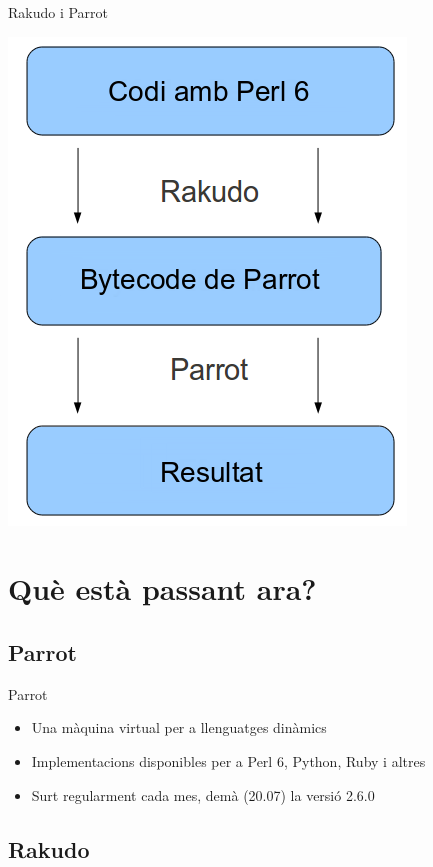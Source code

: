 \documentclass{beamer}
\begin{document}
\begin{frame}{Rakudo i Parrot}
	\begin{center}
		\includegraphics[scale=0.4]{bohomaz_ca}
	\end{center}
\end{frame}
			\section{Què està passant ara?}
			\subsection{Parrot}

\begin{frame}{Parrot}
	\begin{itemize}
		\item Una màquina virtual per a llenguatges dinàmics
		\item Implementacions disponibles per a Perl 6, Python, Ruby i altres
		\item Surt regularment cada mes, demà (20.07) la versió 2.6.0
	\end{itemize}
\end{frame}

			\subsection{Rakudo}
\end{document}
